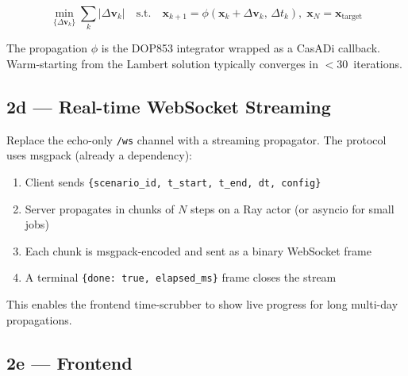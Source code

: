 \documentclass[11pt, a4paper]{article}
\begin{document}
\begin{equation}
  \min_{\{\Delta \mathbf{v}_k\}} \sum_k |\Delta \mathbf{v}_k|
  \quad \text{s.t.} \quad
  \mathbf{x}_{k+1} = \phi(\mathbf{x}_k + \Delta\mathbf{v}_k,\, \Delta t_k),\;
  \mathbf{x}_N = \mathbf{x}_\text{target}
\end{equation}

The propagation $\phi$ is the DOP853 integrator wrapped as a CasADi callback.
Warm-starting from the Lambert solution typically converges in $< 30$~iterations.

\subsection{2d — Real-time WebSocket Streaming}

Replace the echo-only \texttt{/ws} channel with a streaming propagator. The
protocol uses msgpack (already a dependency):

\begin{enumerate}[noitemsep]
  \item Client sends \texttt{\{scenario\_id, t\_start, t\_end, dt, config\}}
  \item Server propagates in chunks of $N$ steps on a Ray actor (or asyncio for
        small jobs)
  \item Each chunk is msgpack-encoded and sent as a binary WebSocket frame
  \item A terminal \texttt{\{done: true, elapsed\_ms\}} frame closes the stream
\end{enumerate}

This enables the frontend time-scrubber to show live progress for long
multi-day propagations.

\subsection{2e — Frontend}
\end{document}
